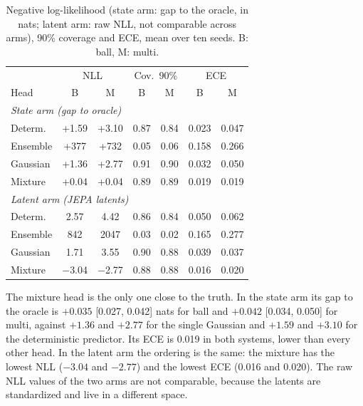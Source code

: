 \documentclass[conference]{IEEEtran}
\begin{document}
\begin{table}[!t]
\caption{Negative log-likelihood (state arm: gap to the oracle, in nats; latent arm: raw NLL, not comparable across arms), 90\% coverage and ECE, mean over ten seeds. B: ball, M: multi.}
\label{tab:uncert}
\centering
\setlength{\tabcolsep}{3.5pt}
\begin{tabular}{lcccccc}
\hline
 & \multicolumn{2}{c}{NLL} & \multicolumn{2}{c}{Cov.\ 90\%} & \multicolumn{2}{c}{ECE} \\
Head & B & M & B & M & B & M \\
\hline
\multicolumn{7}{l}{\emph{State arm (gap to oracle)}} \\
Determ.  & +1.59 & +3.10 & 0.87 & 0.84 & 0.023 & 0.047 \\
Ensemble & +377  & +732  & 0.05 & 0.06 & 0.158 & 0.266 \\
Gaussian & +1.36 & +2.77 & 0.91 & 0.90 & 0.032 & 0.050 \\
Mixture  & +0.04 & +0.04 & 0.89 & 0.89 & 0.019 & 0.019 \\
\hline
\multicolumn{7}{l}{\emph{Latent arm (JEPA latents)}} \\
Determ.  & 2.57  & 4.42  & 0.86 & 0.84 & 0.050 & 0.062 \\
Ensemble & 842   & 2047  & 0.03 & 0.02 & 0.165 & 0.277 \\
Gaussian & 1.71  & 3.55  & 0.90 & 0.88 & 0.039 & 0.037 \\
Mixture  & $-$3.04 & $-$2.77 & 0.88 & 0.88 & 0.016 & 0.020 \\
\hline
\end{tabular}
\end{table}

The mixture head is the only one close to the truth. In the state arm its gap to the oracle is $+0.035$ [0.027, 0.042] nats for ball and $+0.042$ [0.034, 0.050] for multi, against $+1.36$ and $+2.77$ for the single Gaussian and $+1.59$ and $+3.10$ for the deterministic predictor. Its ECE is 0.019 in both systems, lower than every other head. In the latent arm the ordering is the same: the mixture has the lowest NLL ($-3.04$ and $-2.77$) and the lowest ECE (0.016 and 0.020). The raw NLL values of the two arms are not comparable, because the latents are standardized and live in a different space.
\end{document}
